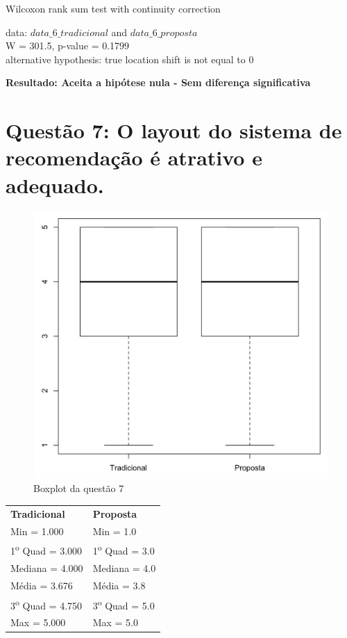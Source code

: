 Wilcoxon rank sum test with continuity correction

\noindent
data:  $data\_6\_tradicional$ and $data\_6\_proposta$\\
W = 301.5, p-value = 0.1799\\
alternative hypothesis: true location shift is not equal to 0

\noindent
\textbf{Resultado: Aceita a hipótese nula - Sem diferença significativa}

\newpage
\section{Questão 7: O layout do sistema de recomendação é atrativo e adequado.}

\begin{figure}[htb]
  \caption{\label{fig:questao7-boxplot}Boxplot da questão 7}
  \begin{center}
      \includegraphics[scale=0.4]{./Figuras/questao7-boxplot.png}
  \end{center}
\end{figure}

\begin{table}[h]
\begin{tabular}{p{}p{}}
\textbf{Tradicional} & \textbf{Proposta} \\
Min = 1.000 & Min = 1.0\\
1\textsuperscript{o} Quad = 3.000 & 1\textsuperscript{o} Quad = 3.0\\
Mediana = 4.000 & Mediana = 4.0\\
Média = 3.676 & Média = 3.8\\
3\textsuperscript{o} Quad = 4.750 & 3\textsuperscript{o} Quad = 5.0\\
Max = 5.000 & Max = 5.0\\
\end{tabular}
\end{table}

